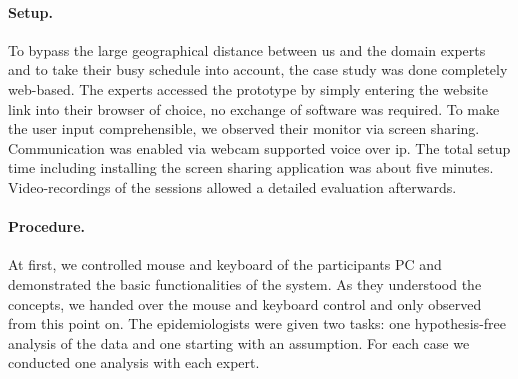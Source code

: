 \documentclass[journal]{style/vgtc} 			          %
\begin{document}
\paragraph{Setup.} To bypass the large geographical distance between us and the domain experts and to take their busy schedule into account, the case study was done completely web-based.
%
The experts accessed the prototype by simply entering the website link into their browser of choice, no exchange of software was required.
%
%
To make the user input comprehensible, we observed their monitor via screen sharing.
%
Communication was enabled via webcam supported voice over ip.
%
The total setup time including installing the screen sharing application was about five minutes.
%
Video-recordings of the sessions allowed a detailed evaluation afterwards.%
%
\paragraph{Procedure.}
At first, we controlled mouse and keyboard of the participants PC and demonstrated the basic functionalities of the system.
%
%
As they understood the concepts, we handed over the mouse and keyboard control and only observed from this point on.
%
The epidemiologists were given two tasks: one hypothesis-free analysis of the data and one starting with an assumption.
%
For each case we conducted one analysis with each expert.

\end{document}

